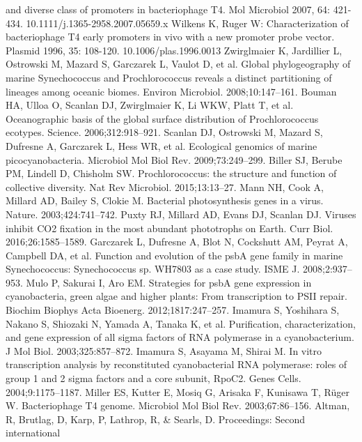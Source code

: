 \documentclass[14pt]{extarticle}
\begin{document}
\begin{thebibliography}{9}
    and diverse class of promoters in bacteriophage T4. Mol Microbiol 2007, 64: 421-434. 
    10.1111/j.1365-2958.2007.05659.x
     Wilkens K, Ruger W: Characterization of bacteriophage T4 early promoters in vivo with a new promoter 
    probe vector. Plasmid 1996, 35: 108-120. 10.1006/plas.1996.0013
     Zwirglmaier K, Jardillier L, Ostrowski M, Mazard S, Garczarek L, Vaulot D, et al. Global phylogeography
    of marine Synechococcus and Prochlorococcus reveals a distinct partitioning of lineages among oceanic biomes.
    Environ Microbiol. 2008;10:147–161.
     Bouman HA, Ulloa O, Scanlan DJ, Zwirglmaier K, Li WKW, Platt T, et al. Oceanographic basis of the 
    global surface distribution of Prochlorococcus ecotypes. Science. 2006;312:918–921.
     Scanlan DJ, Ostrowski M, Mazard S, Dufresne A, Garczarek L, Hess WR, et al. Ecological genomics of 
    marine picocyanobacteria. Microbiol Mol Biol Rev. 2009;73:249–299.
     Biller SJ, Berube PM, Lindell D, Chisholm SW. Prochlorococcus: the structure and function of collective
    diversity. Nat Rev Microbiol. 2015;13:13–27.
     Mann NH, Cook A, Millard AD, Bailey S, Clokie M. Bacterial photosynthesis genes in a virus. Nature. 
    2003;424:741–742.
     Puxty RJ, Millard AD, Evans DJ, Scanlan DJ. Viruses inhibit CO2 fixation in the most abundant 
    phototrophs on Earth. Curr Biol. 2016;26:1585–1589.
     Garczarek L, Dufresne A, Blot N, Cockshutt AM, Peyrat A, Campbell DA, et al. Function and evolution of
    the psbA gene family in marine Synechococcus: Synechococcus sp. WH7803 as a case study. ISME J. 2008;2:937–953.
     Mulo P, Sakurai I, Aro EM. Strategies for psbA gene expression in cyanobacteria, green algae and 
    higher plants: From transcription to PSII repair. Biochim Biophys Acta Bioenerg. 2012;1817:247–257.
     Imamura S, Yoshihara S, Nakano S, Shiozaki N, Yamada A, Tanaka K, et al. Purification, 
    characterization, and gene expression of all sigma factors of RNA polymerase in a cyanobacterium. J Mol Biol. 
    2003;325:857–872.
     Imamura S, Asayama M, Shirai M. In vitro transcription analysis by reconstituted cyanobacterial RNA 
    polymerase: roles of group 1 and 2 sigma factors and a core subunit, RpoC2. Genes Cells. 2004;9:1175–1187.
     Miller ES, Kutter E, Mosiq G, Arisaka F, Kunisawa T, Rüger W. Bacteriophage T4 genome. Microbiol Mol 
    Biol Rev. 2003;67:86–156.
       Altman, R, Brutlag, D, Karp, P, Lathrop, R, \& Searls, D. Proceedings: Second international 

\end{thebibliography}
\end{document}
